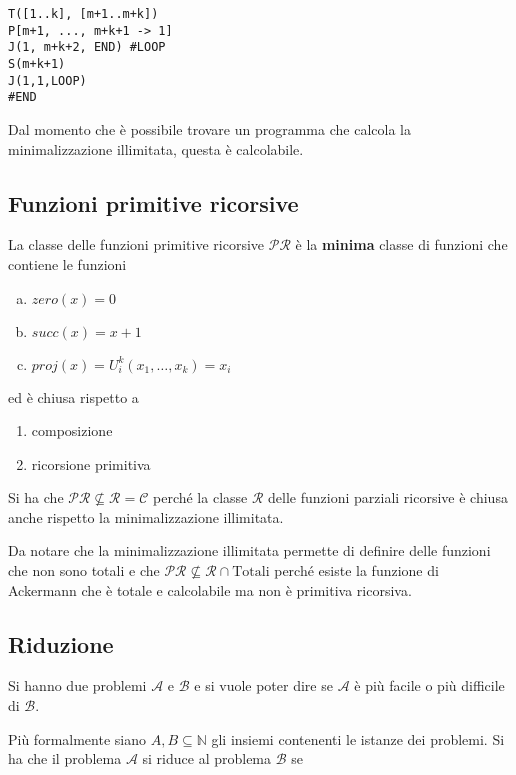 \begin{lstlisting}[language=URM]
T([1..k], [m+1..m+k])
P[m+1, ..., m+k+1 -> 1]
J(1, m+k+2, END) #LOOP
S(m+k+1)
J(1,1,LOOP)
#END
\end{lstlisting}

Dal momento che è possibile trovare un programma che calcola la minimalizzazione illimitata, questa è calcolabile.

\subsection{Funzioni primitive ricorsive}

La classe delle funzioni primitive ricorsive $\mathcal{PR}$ è la \textbf{minima} classe di funzioni che contiene le funzioni

\begin{enumerate}[(a)]
	\item $zero(x) = 0$
	\item $succ(x) = x+1$
	\item $proj(x) = U_{i}^{k}(x_1, \ldots, x_k) = x_i$
\end{enumerate}

ed è chiusa rispetto a 

\begin{enumerate}
	\item composizione
	\item ricorsione primitiva
\end{enumerate}

Si ha che $\mathcal{PR} \nsubseteq \mathcal{R} = \mathcal{C}$ perché la classe $\mathcal{R}$ delle funzioni parziali ricorsive è chiusa anche rispetto la minimalizzazione illimitata.

Da notare che la minimalizzazione illimitata permette di definire delle funzioni che non sono totali e che $\mathcal{PR} \nsubseteq \mathcal{R} \cap \text{Totali}$ perché esiste la funzione di Ackermann che è totale e calcolabile ma non è primitiva ricorsiva.

\subsection{Riduzione}

Si hanno due problemi $\mathcal{A}$ e $\mathcal{B}$ e si vuole poter dire se $\mathcal{A}$ è più facile o più difficile di $\mathcal{B}$.

Più formalmente siano $A,B \subseteq \mathbb{N}$ gli insiemi contenenti le istanze dei problemi. Si ha che il problema $\mathcal{A}$ si riduce al problema $\mathcal{B}$ se 


